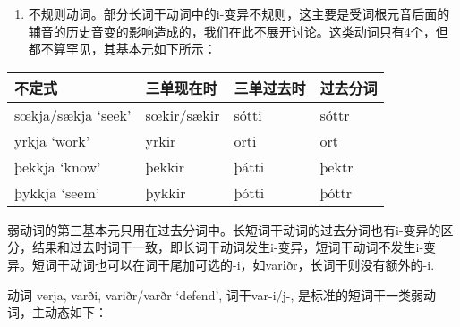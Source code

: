 \begin{enumerate}
  \def\labelenumi{\arabic{enumi})}
  \setcounter{enumi}{2}
  \item
        不规则动词。部分长词干动词中的i-变异不规则，这主要是受词根元音后面的辅音的历史音变的影响造成的，我们在此不展开讨论。这类动词只有4个，但都不算罕见，其基本元如下所示：
\end{enumerate}

\begin{longtable}{llll}
  \toprule
  不定式             & 三单现在时  & 三单过去时 & 过去分词 \\
  \midrule
  \endhead
  \bottomrule
  \endfoot
  sœkja/sækja `seek' & sœkir/sækir & sótti      & sóttr    \\
  yrkja `work'       & yrkir       & orti       & ort      \\
  þekkja `know'      & þekkir      & þátti      & þektr    \\
  þykkja `seem'      & þykkir      & þótti      & þóttr    \\
\end{longtable}

弱动词的第三基本元只用在过去分词中。长短词干动词的过去分词也有i-变异的区分，结果和过去时词干一致，即长词干动词发生i-变异，短词干动词不发生i-变异。短词干动词也可以在词干尾加可选的-i，如var\textbf{i}ðr，长词干则没有额外的-i.

动词 verja, varði, variðr/varðr `defend‌', 词干var-i/j-,
是标准的短词干一类弱动词，主动态如下：

